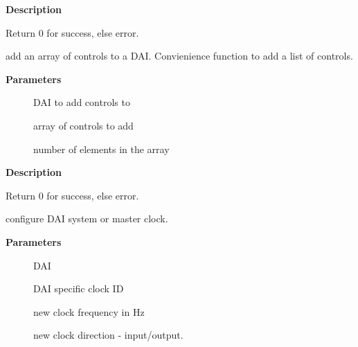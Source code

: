 \documentclass[a4paper,8pt,english]{sphinxmanual}
\begin{document}
\textbf{Description}

Return 0 for success, else error.

\begin{fulllineitems}
\label{sound/kernel-api/alsa-driver-api:c.snd_soc_add_dai_controls}
add an array of controls to a DAI. Convienience function to add a list of controls.

\end{fulllineitems}


\textbf{Parameters}
\begin{description}
\item[{}] \leavevmode
DAI to add controls to

\item[{}] \leavevmode
array of controls to add

\item[{}] \leavevmode
number of elements in the array

\end{description}

\textbf{Description}

Return 0 for success, else error.

\begin{fulllineitems}
\label{sound/kernel-api/alsa-driver-api:c.snd_soc_dai_set_sysclk}
configure DAI system or master clock.

\end{fulllineitems}


\textbf{Parameters}
\begin{description}
\item[{}] \leavevmode
DAI

\item[{}] \leavevmode
DAI specific clock ID

\item[{}] \leavevmode
new clock frequency in Hz

\item[{}] \leavevmode
new clock direction - input/output.

\end{description}
\end{document}
